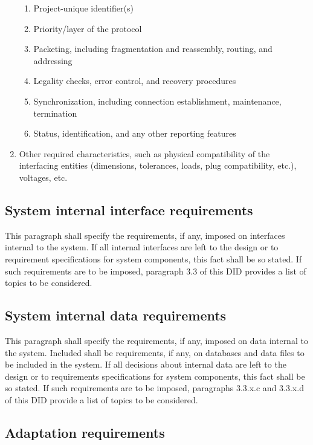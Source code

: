 \begin{enumerate}
  \begin{enumerate}
  \itemsep1pt\parskip0pt
  \item
    Project-unique identifier(s)
  \item
    Priority/layer of the protocol
  \item
    Packeting, including fragmentation and reassembly, routing, and
    addressing
  \item
    Legality checks, error control, and recovery procedures
  \item
    Synchronization, including connection establishment, maintenance,
    termination
  \item
    Status, identification, and any other reporting features
  \end{enumerate}
\item
  Other required characteristics, such as physical compatibility of the
  interfacing entities (dimensions, tolerances, loads, plug
  compatibility, etc.), voltages, etc.
\end{enumerate}

\subsection{System internal interface requirements}

This paragraph shall specify the requirements, if any, imposed on
interfaces internal to the system. If all internal interfaces are left
to the design or to requirement specifications for system components,
this fact shall be so stated. If such requirements are to be imposed,
paragraph 3.3 of this DID provides a list of topics to be considered.

\subsection{System internal data requirements}

This paragraph shall specify the requirements, if any, imposed on data
internal to the system. Included shall be requirements, if any, on
databases and data files to be included in the system. If all decisions
about internal data are left to the design or to requirements
specifications for system components, this fact shall be so stated. If
such requirements are to be imposed, paragraphs 3.3.x.c and 3.3.x.d of
this DID provide a list of topics to be considered.

\subsection{Adaptation requirements}

